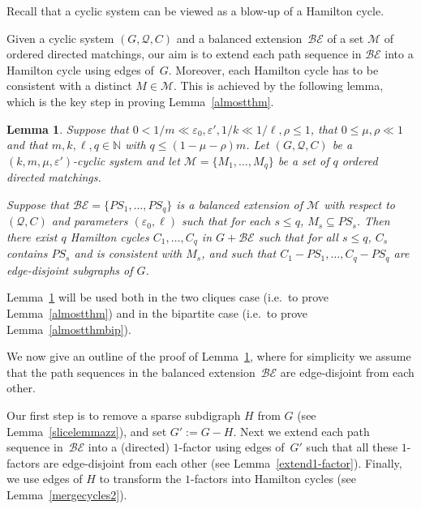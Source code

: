 \documentclass{memo-l}
\newtheorem{lemma}[firstthm]{Lemma}
\def\COMMENT#1{}
\def\eps{\varepsilon}
\numberwithin{section}{chapter}
\numberwithin{equation}{section}
\numberwithin{firstthm}{section}
\numberwithin{figure}{section}
\begin{document}
{Recall that a cyclic system can be viewed as a blow-up of a Hamilton cycle.%
   \COMMENT{Deryk: new sentence}
Given a cyclic system $(G,\mathcal{Q}, C)$ and a balanced extension~$\mathcal{BE}$ of a set $\mathcal{M}$
of ordered directed matchings,
our aim is to extend each path sequence in $\mathcal{BE}$ into a Hamilton cycle using edges of~$G$.
Moreover, each Hamilton cycle has to be consistent with a distinct $M \in \mathcal{M}$. This is achieved by the
following lemma, which is the key step in proving Lemma~\ref{almostthm}.%
   \COMMENT{Deryk: new sentence}


\begin{lemma}\label{merging}
Suppose that $0<1/m \ll \eps_0, \eps' , 1/k \ll 1/\ell , \rho  \leq 1$, that $0 \le \mu , \rho \ll 1$\COMMENT{It is intentional that I have stated two conditions with $\rho$ in. Thought
it was the easiest way to write $\eps_0, \eps' , 1/k \ll 1/\ell , \rho $, and $1/\ell \leq 1$ and
$\rho \ll 1$.}
 and that $m,k, \ell, q\in \mathbb{N}$ with $q \le (1- \mu - \rho) m$.
Let $(G,\mathcal{Q}, C)$ be a $(k,m, \mu, \eps')$-cyclic system and let $\mathcal{M} = \{M_1, \dots, M_q\}$
be a set of $q$ ordered directed matchings.%
	\COMMENT{Allan: $M_1, \dots, M_1$ are no longer edge-disjoint. Reason:
In two cliques case, $J^*_A = M_1$. This has lots of knock on effect on the rest....
The next two sentences also changed.}
Suppose that $\mathcal{BE} = \{ PS_1, \dots, PS_q \}$ is a balanced extension of $\mathcal{M}$ with respect to $(\mathcal{Q},C)$ and
parameters $(\eps_0, \ell)$ such that for each $s \le q$, $M_s \subseteq PS_s$.
Then there exist $q$ Hamilton cycles $C_1, \dots, C_q$ in $G + \mathcal{BE}$ such that for all $s \le q$, $C_s$ contains $PS_s$ and is consistent with $M_s$, and such that $C_1 - PS_1, \dots, C_q - PS_q$ are edge-disjoint subgraphs of $G$.
\end{lemma}

Lemma~\ref{merging} will be used both in the two cliques case (i.e.~to prove Lemma~\ref{almostthm}) and in the bipartite case (i.e.~to prove Lemma~\ref{almostthmbip}).

We now give an outline of the proof of Lemma~\ref{merging}, where for simplicity we assume that
the path sequences in the balanced extension~$\mathcal{BE}$ are edge-disjoint from each other.%
	\COMMENT{Deryk: reworded}
Our first step is to remove a sparse subdigraph $H$ from $G$ (see Lemma~\ref{slicelemmazz}), and set $G':= G - H$.
Next we extend each path sequence in~$\mathcal{BE}$ into a (directed) $1$-factor using edges of~$G'$
such that all these $1$-factors are edge-disjoint from each other (see Lemma~\ref{extend1-factor}). 
Finally, we use edges of $H$ to transform the $1$-factors into Hamilton cycles (see Lemma~\ref{mergecycles2}).


}
\end{document}
